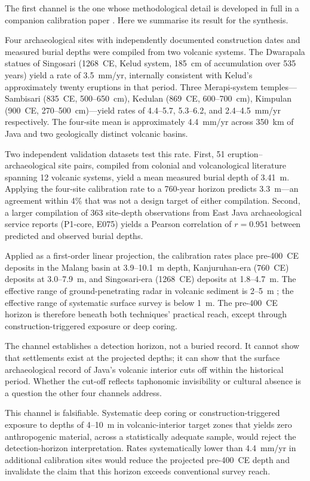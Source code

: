 \documentclass[12pt,a4paper]{article}
\begin{document}
The first channel is the one whose methodological detail is developed in full in a companion calibration paper \citep{amien_p1core}. Here we summarise its result for the synthesis.

Four archaeological sites with independently documented construction dates and measured burial depths were compiled from two volcanic systems. The Dwarapala statues of Singosari (1268~CE, Kelud system, 185~cm of accumulation over 535 years) yield a rate of 3.5~mm/yr, internally consistent with Kelud's approximately twenty eruptions in that period. Three Merapi-system temples---Sambisari (835~CE, 500--650~cm), Kedulan (869~CE, 600--700~cm), Kimpulan (900~CE, 270--500~cm)---yield rates of 4.4--5.7, 5.3--6.2, and 2.4--4.5~mm/yr respectively. The four-site mean is approximately 4.4~mm/yr across 350~km of Java and two geologically distinct volcanic basins.

Two independent validation datasets test this rate. First, 51 eruption--archaeological site pairs, compiled from colonial and volcanological literature spanning 12 volcanic systems, yield a mean measured burial depth of 3.41~m. Applying the four-site calibration rate to a 760-year horizon predicts 3.3~m---an agreement within 4\% that was not a design target of either compilation. Second, a larger compilation of 363 site-depth observations from East Java archaeological service reports (P1-core, E075) yields a Pearson correlation of $r=0.951$ between predicted and observed burial depths.

Applied as a first-order linear projection, the calibration rates place pre-400~CE deposits in the Malang basin at 3.9--10.1~m depth, Kanjuruhan-era (760~CE) deposits at 3.0--7.9~m, and Singosari-era (1268~CE) deposits at 1.8--4.7~m. The effective range of ground-penetrating radar in volcanic sediment is 2--5~m \citep{conyers2004,goodman2013}; the effective range of systematic surface survey is below 1~m. The pre-400~CE horizon is therefore beneath both techniques' practical reach, except through construction-triggered exposure or deep coring.

The channel establishes a detection horizon, not a buried record. It cannot show that settlements exist at the projected depths; it can show that the surface archaeological record of Java's volcanic interior cuts off within the historical period. Whether the cut-off reflects taphonomic invisibility or cultural absence is a question the other four channels address.

This channel is falsifiable. Systematic deep coring or construction-triggered exposure to depths of 4--10~m in volcanic-interior target zones that yields zero anthropogenic material, across a statistically adequate sample, would reject the detection-horizon interpretation. Rates systematically lower than 4.4~mm/yr in additional calibration sites would reduce the projected pre-400~CE depth and invalidate the claim that this horizon exceeds conventional survey reach.
\end{document}
